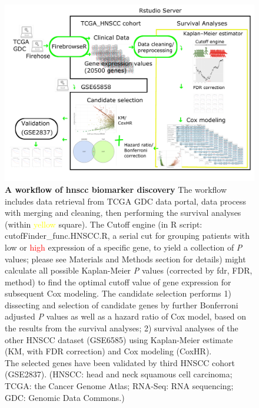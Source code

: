 \documentclass[jpm,article,submit,moreauthors,pdftex]{Definitions/mdpi}
\newcommand{\bcaption}[2]{\caption{\textbf{#1} #2}}
\begin{document}
\begin{figure}[hp]
\centering
\includegraphics[width=14cm]{Figure_1_manuscript_workflow} %
\bcaption{A workflow of \acrshort{hnscc} biomarker discovery}
{The workflow includes data retrieval from TCGA GDC data portal, data process with merging and cleaning,%
then performing the survival analyses (within \textcolor{yellow}{yellow} square). The Cutoff engine (in R script: cutofFinder\_func.HNSCC.R, a serial cut for grouping patients with \textcolor{asparagus}{low} or \textcolor{red}{high} expression of a specific gene, to yield a collection of \textit{P} values; please see Materials and Methods section for details) might calculate all possible Kaplan-Meier \textit{P} values (corrected by \acrlong{fdr}, FDR, method) to find the optimal cutoff value of gene expression for subsequent Cox modeling.
The candidate selection performs 1) dissecting and selection of candidate genes by further Bonferroni adjusted \textit{P} values as well as a hazard ratio of Cox model, based on the results from the survival analyses;
2) survival analyses of the other HNSCC dataset (GSE6585) using Kaplan-Meier estimate (KM, with FDR correction) and Cox modeling (CoxHR).\\
The selected genes have been validated by third HNSCC cohort (GSE2837).
(HNSCC: head and neck squamous cell carcinoma; TCGA: the Cancer Genome Atlas; RNA-Seq: RNA sequencing; GDC: Genomic Data Commons.)}
\label{fig:figure1}


\end{figure}
\end{document}
